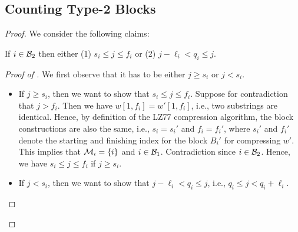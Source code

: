 \subsection{Counting Type-2 Blocks}

\begin{remindertheorem}{}
    \lemblocknumstatement
\end{remindertheorem}

\begin{proof}
We consider the following claims:
\begin{claim}


    If $i\in{\ensuremath{\mathcal{B}}}_2$ then either (1) $s_i\leq j\leq f_i$ or (2) $j-\ell_i < q_i \leq j$.
\end{claim}
\begin{proof}[Proof of ]
    We first observe that it has to be either $j\geq s_i$ or $j<s_i$.
    \begin{itemize}
        \item If $j\geq s_i$, then we want to show that $s_i\leq j\leq f_i$. Suppose for contradiction that $j>f_i$. Then we have $w[1,f_i]=w'[1,f_i]$, i.e., two substrings are identical. Hence, by definition of the LZ77 compression algorithm, the block constructions are also the same, i.e., $s_i=s_i'$ and $f_i=f_i'$, where $s_i'$ and $f_i'$ denote the starting and finishing index for the block $B_i'$ for compressing $w'$. This implies that $\mathcal{M}_i=\{i\}$ and $i\in{\ensuremath{\mathcal{B}}}_1$. Contradiction since $i\in{\ensuremath{\mathcal{B}}}_2$. Hence, we have $s_i\leq j\leq f_i$ if $j\geq s_i$.
        \item If $j<s_i$, then we want to show that $j-\ell_i<q_i\leq j$, i.e., $q_i\leq j < q_i+\ell_i$. 
        

\end{itemize}
\end{proof}
\end{proof}
